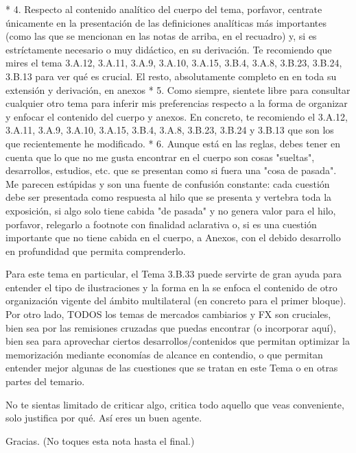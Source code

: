 \documentclass[10pt,a4paper]{article}
\newcommand{\modificaciones}[1]{
  \begin{tcolorbox}[
    colback=white,
    colframe=red,
    title={Modificaciones a realizar},
    before upper={\setlength{\parindent}{0.5cm}\setlength{\parskip}{0.5\baselineskip}}
  ]
  #1
  \end{tcolorbox}
}
\newcounter{anexo}
\begin{document}
{{    * 4. Respecto al contenido analítico del cuerpo del tema, porfavor, centrate únicamente en la presentación de las definiciones analíticas más importantes (como las que se mencionan en las notas de arriba, en el recuadro) y, si es estríctamente necesario o muy didáctico, en su derivación. Te recomiendo que mires el tema 3.A.12, 3.A.11, 3.A.9, 3.A.10, 3.A.15, 3.B.4, 3.A.8, 3.B.23, 3.B.24, 3.B.13 para ver qué es crucial. El resto, absolutamente completo en en toda su extensión y derivación, en anexos
    * 5. Como siempre, sientete libre para consultar cualquier otro tema para inferir mis preferencias respecto a la forma de organizar y enfocar el contenido del cuerpo y anexos. En concreto, te recomiendo el 3.A.12, 3.A.11, 3.A.9, 3.A.10, 3.A.15, 3.B.4, 3.A.8, 3.B.23, 3.B.24 y 3.B.13 que son los que recientemente he modificado. 
    * 6. Aunque está en las reglas, debes tener en cuenta que lo que no me gusta encontrar en el cuerpo son cosas "sueltas", desarrollos, estudios, etc. que se presentan como si fuera una "cosa de pasada". Me parecen estúpidas y son una fuente de confusión constante: cada cuestión debe ser presentada como respuesta al hilo que se presenta y vertebra toda la exposición, si algo solo tiene cabida "de pasada" y no genera valor para el hilo, porfavor, relegarlo a footnote con finalidad aclarativa o, si es una cuestión importante que no tiene cabida en el cuerpo, a Anexos, con el debido desarrollo en profundidad que permita comprenderlo.

    Para este tema en particular, el Tema 3.B.33 puede servirte de gran ayuda para entender el tipo de ilustraciones y la forma en la se enfoca el contenido de otro organización vigente del ámbito multilateral (en concreto para el primer bloque). Por otro lado, TODOS los temas de mercados cambiarios y FX son cruciales, bien sea por las remisiones cruzadas que puedas encontrar (o incorporar aquí), bien sea para aprovechar ciertos desarrollos/contenidos que permitan optimizar la memorización mediante economías de alcance en contendio, o que permitan entender mejor algunas de las cuestiones que se tratan en este Tema o en otras partes del temario. 

    No te sientas limitado de criticar algo, critica todo aquello que veas conveniente, solo justifica por qué. Así eres un buen agente. 

    Gracias. (No toques esta nota hasta el final.)
    }
    }
\vspace{1cm}

\modificaciones{
    
    }
\end{document}
